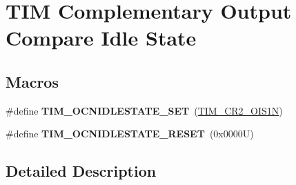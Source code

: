 \hypertarget{group___t_i_m___output___compare___n___idle___state}{}\section{T\+IM Complementary Output Compare Idle State}
\label{group___t_i_m___output___compare___n___idle___state}
\subsection*{Macros}
\begin{DoxyCompactItemize}
\item 
\mbox{\label{group___t_i_m___output___compare___n___idle___state_ga1f781774c71822b2502633dfc849c5ea}} 
\#define {\bfseries T\+I\+M\+\_\+\+O\+C\+N\+I\+D\+L\+E\+S\+T\+A\+T\+E\+\_\+\+S\+ET}~(\hyperlink{group___peripheral___registers___bits___definition_gae61f8d54923999fffb6db381e81f2b69}{T\+I\+M\+\_\+\+C\+R2\+\_\+\+O\+I\+S1N})
\item 
\mbox{\label{group___t_i_m___output___compare___n___idle___state_ga7586655652e3c3f1cb4af1ed59d25901}} 
\#define {\bfseries T\+I\+M\+\_\+\+O\+C\+N\+I\+D\+L\+E\+S\+T\+A\+T\+E\+\_\+\+R\+E\+S\+ET}~(0x0000\+U)
\end{DoxyCompactItemize}


\subsection{Detailed Description}
